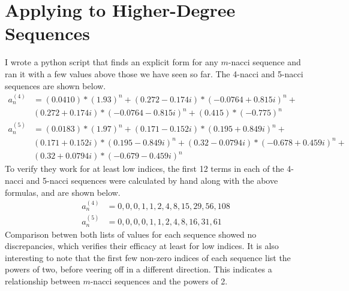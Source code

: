 \documentclass[11pt]{article}
\begin{document}
\section{Applying to Higher-Degree Sequences}
I wrote a python script that finds an explicit form for any \(m\)-nacci sequence and ran it with a few values above those we have seen so far. The 4-nacci and 5-nacci sequences are shown below. 
\begin{align*}
    a_n^{(4)} &= (0.0410)*(1.93)^n + (0.272 - 0.174i)*(-0.0764 + 0.815i)^n + \\ &(0.272 + 0.174i)*(-0.0764 - 0.815i)^n + (0.415)*(-0.775)^n \\
    a_n^{(5)} &= (0.0183)*(1.97)^n + (0.171 - 0.152i)*(0.195 + 0.849i)^n + \\ & (0.171 + 0.152i)*(0.195 - 0.849i)^n + (0.32 - 0.0794i)*(-0.678 + 0.459i)^n + \\ & (0.32 + 0.0794i)*(-0.679 - 0.459i)^n
\end{align*}
To verify they work for at least low indices, the first 12 terms in each of the 4-nacci and 5-nacci sequences were calculated by hand along with the above formulas, and are shown below. 
\begin{align*}
    a_{n}^{(4)}&= 0,0,0,1,1,2,4,8,15,29,56,108 \\
    a_{n}^{(5)}&= 0,0,0,0,1,1,2,4,8,16,31,61
\end{align*}
Comparison betwen both lists of values for each sequence showed no discrepancies, which verifies their efficacy at least for low indices. It is also interesting to note that the first few non-zero indices of each sequence list the powers of two, before veering off in a different direction. This indicates a relationship between \(m\)-nacci sequences and the powers of 2.
\end{document}
